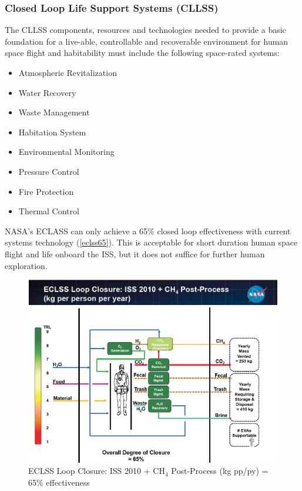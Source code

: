 \documentclass[letter,11pt]{article}
\begin{document}
\subsubsection*{Closed Loop Life Support Systems (CLLSS)}

The CLLSS components, resources and technologies needed to provide a basic foundation for a live-able, controllable and recoverable environment for human space flight and habitability must include the following space-rated systems:

\begin{itemize}
	\item Atmospheric Revitalization

	\item  Water Recovery

  \item Waste Management

  \item Habitation System

  \item Environmental Monitoring

  \item Pressure Control

  \item Fire Protection

  \item Thermal Control

\end{itemize}

NASA's ECLASS can only achieve a 65\% closed loop effectiveness with current
systems technology (\autoref{eclss65}). This is acceptable for short duration
human space flight and life onboard the \gls{ISS}, but it does not suffice for
further human exploration.

 
\begin{figure}[hb!]
	\centering
	\includegraphics[width=\textwidth]{SJTable1}

	\caption{ECLSS Loop Closure: ISS 2010 + CH$_4$ Post-Process (kg pp/py) = 65\% effectiveness \cite{Neumeyer2010}}
	\label{eclss65}
\end{figure}
\end{document}
